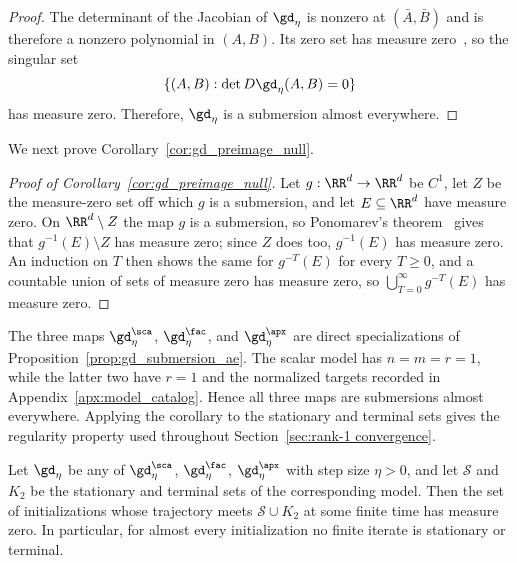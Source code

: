 \documentclass{article}
\begin{document}
\begin{proof}
The determinant of the Jacobian of $\gd_\eta$ is nonzero at
$(\bar A,\bar B)$ and is therefore a nonzero polynomial in $(A,B)$. Its zero
set has measure zero~\citep{mityagin2015zero}, so the singular set
\begin{align}
\{(A,B): \det D\gd_\eta(A,B)=0\}
\end{align}
has measure zero.
Therefore, $\gd_\eta$ is a submersion almost everywhere.
\end{proof}

We next prove Corollary~\ref{cor:gd_preimage_null}.

\begin{proof}[Proof of Corollary~\ref{cor:gd_preimage_null}]
Let $g:\RR^d\to\RR^d$ be $C^1$, let $Z$ be the measure-zero set off which $g$ is a
submersion, and let $E\subseteq\RR^d$ have measure zero. On
$\RR^d\setminus Z$ the map $g$ is a submersion, so Ponomarev's
theorem~\citep{ponomarev1987submersions} gives that
$g^{-1}(E)\setminus Z$ has measure zero; since $Z$ does too,
$g^{-1}(E)$ has measure zero. An induction on $T$ then shows the same for
$g^{-T}(E)$ for every $T\ge 0$, and a countable union of sets of measure zero
has measure zero, so
$\bigcup_{T=0}^{\infty}g^{-T}(E)$ has measure zero.
\end{proof}

The three maps $\gd_\eta^\sca$, $\gd_\eta^\fac$, and $\gd_\eta^\apx$ are direct
specializations of Proposition~\ref{prop:gd_submersion_ae}. The scalar model has
$n=m=r=1$, while the latter two have $r=1$ and the normalized targets recorded
in Appendix~\ref{apx:model_catalog}. Hence all three maps are submersions almost
everywhere.
Applying the corollary to the stationary and terminal sets gives the regularity
property used throughout Section~\ref{sec:rank-1 convergence}.

\begin{proposition}
\label{prop:regularity}
Let $\gd_\eta$ be any of $\gd_\eta^\sca$, $\gd_\eta^\fac$, $\gd_\eta^\apx$ with
step size $\eta>0$, and let $\mathcal S$ and $K_2$ be the stationary and
terminal sets of the corresponding model. Then the set of initializations whose
trajectory meets $\mathcal S\cup K_2$ at some finite time has measure zero. In
particular, for almost every initialization no finite iterate is stationary or
terminal.
\end{proposition}
\end{document}
